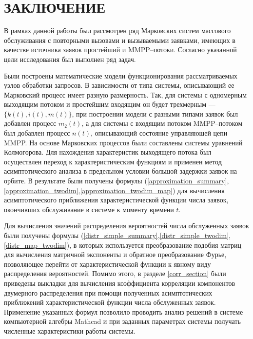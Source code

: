 \section*{\centering\normalsize ЗАКЛЮЧЕНИЕ}
В рамках данной работы был рассмотрен ряд Марковских систем массового обслуживания с повторными вызовами и вызываемыми заявками, имеющих в качестве источника заявок простейший и MMPP--потоки. Согласно указанной цели исследования был выполнен ряд задач.

Были построены математические модели функционирования рассматриваемых узлов обработки запросов. В зависимости от типа системы, описывающий ее Марковский процесс имеет разную размерность. Так, для системы с одномерным выходящим потоком и простейшим входящим он будет трехмерным --- $\{k(t),i(t),m(t)\}$, при построении модели с разными типами заявок был добавлен процесс $m_{2}(t)$, а для системы с входящим потоком MMPP--потоком был добавлен процесс $n(t)$, описывающий состояние управляющей цепи MMPP. На основе Марковских процессов были составлены системы уравнений Колмогорова. Для нахождения характеристик выходящего потока был осуществлен переход к характеристическим функциям и применен метод асимптотического анализа в предельном условии большой задержки заявок на орбите. В результате были получены формулы (\ref{approximation_summary},\ref{approximation_twodim},\ref{approximation_twodim_map}) для вычисления асимптотического приближения характеристической функции числа заявок, окончивших обслуживание в системе к моменту времени $t$.

Для вычисления значений распределения вероятностей числа обслуженных заявок были получены формулы (\ref{distr_simple_summary},\ref{distr_simple_twodim},\ref{distr_map_twodim}), в которых используется преобразование подобия матриц для вычисления матричной экспоненты и обратное преобразование Фурье, позволяющее перейти от характеристической функции к явному виду распределения вероятностей. Помимо этого, в разделе \ref{corr_section} были приведены выкладки для вычисления коэффициента корреляции компонентов двумерного распределения при помощи полученных асимптотических приближений характеристической функции числа обслуженных заявок. Применение указанных формул позволило проводить анализ решений в системе компьютерной алгебры Mathcad и при заданных параметрах системы получать численные характеристики работы системы.

